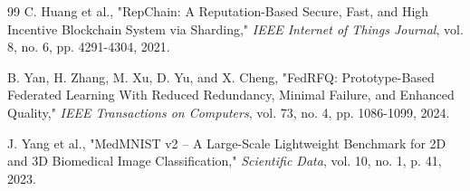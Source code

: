 \begin{thebibliography}{99}
 C. Huang et al., "RepChain: A Reputation-Based Secure, Fast, and High Incentive Blockchain System via Sharding," \textit{IEEE Internet of Things Journal}, vol. 8, no. 6, pp. 4291-4304, 2021.

 B. Yan, H. Zhang, M. Xu, D. Yu, and X. Cheng, "FedRFQ: Prototype-Based Federated Learning With Reduced Redundancy, Minimal Failure, and Enhanced Quality," \textit{IEEE Transactions on Computers}, vol. 73, no. 4, pp. 1086-1099, 2024.

 J. Yang et al., "MedMNIST v2 -- A Large-Scale Lightweight Benchmark for 2D and 3D Biomedical Image Classification," \textit{Scientific Data}, vol. 10, no. 1, p. 41, 2023.




\end{thebibliography}
